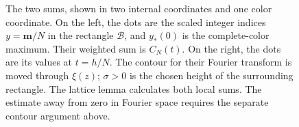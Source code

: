 \begin{figure}[ht]
 \centering
 \caption{The two sums, shown in two internal coordinates and one color
coordinate. On the left, the dots are the scaled integer indices
$y=\mathbf m/N$ in the rectangle $\mathcal B$, and $y_*(0)$ is the
complete-color maximum. Their weighted sum is $C_N(t)$. On the
right, the dots are its values at $t=h/N$. The contour for their
Fourier transform is moved through $\xi(z)$; $\sigma>0$ is the
chosen height of the surrounding rectangle. The lattice lemma
calculates both local sums. The estimate away from zero in Fourier
space requires the separate contour argument above.}\label{ca:two-lattices}
\end{figure}
